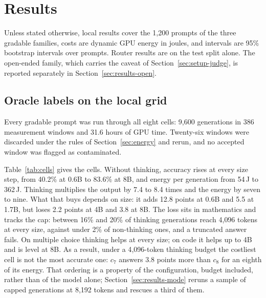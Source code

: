 \section{Results}
\label{sec:results}

Unless stated otherwise, local results cover the 1{,}200 prompts of the three
gradable families, costs are dynamic GPU energy in joules, and intervals are
95\% bootstrap intervals over prompts. Router results are on the test split
alone. The open-ended family, which carries the caveat of
Section~\ref{sec:setup-judge}, is reported separately in
Section~\ref{sec:results-open}.

\subsection{Oracle labels on the local grid}
\label{sec:results-labels}

Every gradable prompt was run through all eight cells: 9{,}600 generations in
386 measurement windows and 31.6 hours of GPU time. Twenty-six windows were
discarded under the rules of Section~\ref{sec:energy} and rerun, and no
accepted window was flagged as contaminated.

\begin{table}[ht]
\centering
\small
\caption{The eight cells over the 1{,}200 gradable prompts, one sample per
prompt and cell. Accuracy counts a capped generation as a failure, and Capped
is the share of generations that reached the token cap. Tokens are input plus
output, reasoning included. Latency and energy are means per generation;
energy is dynamic board energy, and J per solved divides it by accuracy.}
\label{tab:cells}

\end{table}

Table~\ref{tab:cells} gives the cells. Without thinking, accuracy rises at
every size step, from 40.2\% at 0.6B to 83.6\% at 8B, and energy per
generation from 54\,J to 362\,J. Thinking multiplies the output by 7.4 to 8.4
times and the energy by seven to nine. What that buys depends on size: it
adds 12.8 points at 0.6B and 5.5 at 1.7B, but loses 2.2 points at 4B and 3.8
at 8B. The loss sits in mathematics and tracks the cap: between 16\% and 20\%
of thinking generations reach 4{,}096 tokens at every size, against under 2\%
of non-thinking ones, and a truncated answer fails. On multiple choice
thinking helps at every size; on code it helps up to 4B and is level at 8B.
As a result, under a 4{,}096-token thinking budget the costliest cell is not
the most accurate one: $c_7$ answers 3.8 points more than $c_8$ for an eighth
of its energy. That ordering is a property of the configuration, budget
included, rather than of the model alone; Section~\ref{sec:results-mode}
reruns a sample of capped generations at 8{,}192 tokens and rescues a third
of them.

